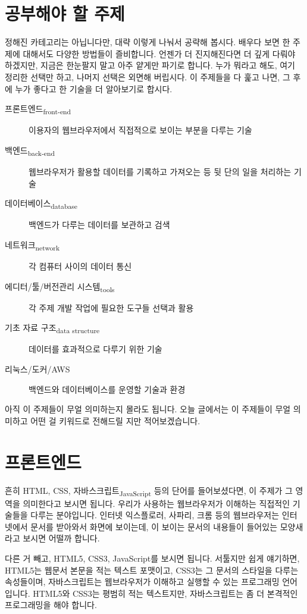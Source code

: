 \documentclass[11pt,a4paper]{article}
\begin{document}
\section{공부해야 할 주제}
정해진 카테고리는 아닙니다만, 대략 이렇게 나눠서 공략해 봅시다. 배우다 보면 한 주제에 대해서도 다양한 방법들이 즐비합니다.  언젠가 더 진지해진다면 더 깊게 다뤄야 하겠지만, 지금은 한눈팔지 말고 아주 얕게만 파기로 합니다. 누가 뭐라고 해도, 여기 정리한 선택만 하고, 나머지 선택은 외면해 버립시다. 이 주제들을 다 훑고 나면, 그 후에 누가 좋다고 한 기술을 더 알아보기로 합시다.

\begin{description}
\item[프론트엔드\textsubscript{front-end}] 이용자의 웹브라우저에서 직접적으로 보이는 부분을 다루는 기술
\item[백엔드\textsubscript{back-end}] 웹브라우저가 활용할 데이터를 기록하고 가져오는 등 뒷 단의 일을 처리하는 기술
\item[데이터베이스\textsubscript{database}] 백엔드가 다루는 데이터를 보관하고 검색
\item[네트워크\textsubscript{network}] 각 컴퓨터 사이의 데이터 통신
\item[에디터/툴/버전관리 시스템\textsubscript{tools}] 각 주제 개발 작업에 필요한 도구들 선택과 활용
\item[기초 자료 구조\textsubscript{data structure}] 데이터를 효과적으로 다루기 위한 기술
\item[리눅스/도커/AWS] 백엔드와 데이터베이스를 운영할 기술과 환경
\end{description}

아직 이 주제들이 무얼 의미하는지 몰라도 됩니다. 오늘 글에서는 이 주제들이 무얼 의미하고 어떤 걸 키워드로 전해드릴 지만 적어보겠습니다.

\section{프론트엔드}
흔히 \textsf{HTML, CSS, 자바스크립트\textsubscript{JavaScript}} 등의 단어를 들어보셨다면, 이 주제가 그 영역을 의미한다고 보시면 됩니다. 우리가 사용하는 웹브라우저가 이해하는 직접적인 기술들을 다루는 분야입니다. 인터넷 익스플로러, 사파리, 크롬 등의 웹브라우저는 인터넷에서 문서를 받아와서 화면에 보이는데, 이 보이는 문서의 내용들이 들어있는 모양새라고 보시면 어떨까 합니다.

다른 거 빼고, \textsf{HTML5, CSS3, JavaScript}를 보시면 됩니다. 서툴지만 쉽게 얘기하면, \textsf{HTML5}는 웹문서 본문을 적는 텍스트 포맷이고, \textsf{CSS3}는 그 문서의 스타일을 다루는 속성들이며, \textsf{자바스크립트}는 웹브라우저가 이해하고 실행할 수 있는 프로그래밍 언어입니다. \textsf{HTML5}와 \textsf{CSS3}는 평범히 적는 텍스트지만, \textsf{자바스크립트}는 좀 더 본격적인 프로그래밍을 해야 합니다.
\end{document}
